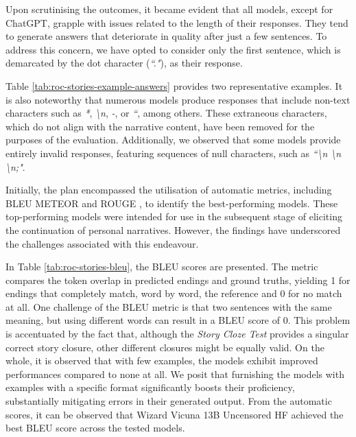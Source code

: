 Upon scrutinising the outcomes, it became evident that all models, except for ChatGPT, grapple with issues related to the length of their responses. They tend to generate answers that deteriorate in quality after just a few sentences. To address this concern, we have opted to consider only the first sentence, which is demarcated by the dot character (\emph{``."}), as their response.

Table \ref{tab:roc-stories-example-answers} provides two representative examples. It is also noteworthy that numerous models produce responses that include non-text characters such as \emph{*}, \emph{\textbackslash n}, \emph{-}, or \emph{``}, among others. These extraneous characters, which do not align with the narrative content, have been removed for the purposes of the evaluation. Additionally, we observed that some models provide entirely invalid responses, featuring sequences of null characters, such as \emph{``\textbackslash n \textbackslash n \textbackslash n;"}. %

% 

Initially, the plan encompassed the utilisation of automatic metrics, including BLEU \cite{bleu} METEOR \cite{meteor} and ROUGE \cite{rouge}, to identify the best-performing models. These top-performing models were intended for use in the subsequent stage of eliciting the continuation of personal narratives. However, the findings have underscored the challenges associated with this endeavour.

% 
% 
In Table \ref{tab:roc-stories-bleu}, the BLEU scores are presented. The metric compares the token overlap in predicted endings and ground truths, yielding 1 for endings that completely match, word by word, the reference and 0 for no match at all. One challenge of the BLEU metric is that two sentences with the same meaning, but using different words can result in a BLEU score of 0. This problem is accentuated by the fact that, although the \emph{Story Cloze Test} provides a singular correct story closure, other different closures might be equally valid. 
On the whole, it is observed that with few examples, the models exhibit improved performances compared to none at all. We posit that furnishing the models with examples with a specific format significantly boosts their proficiency, substantially mitigating errors in their generated output. From the automatic scores, it can be observed that Wizard Vicuna 13B Uncensored HF achieved the best BLEU score across the tested models.


